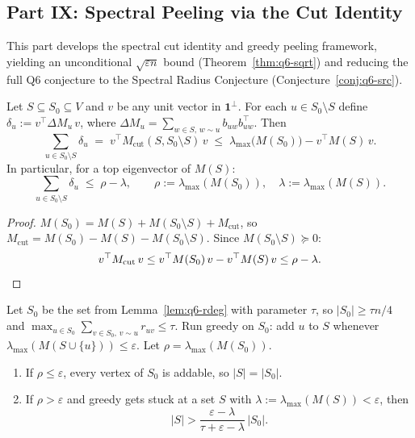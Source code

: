 \subsection*{Part IX: Spectral Peeling via the Cut Identity}

This part develops the spectral cut identity and greedy peeling
framework, yielding an unconditional $\sqrt{\varepsilon n}$ bound
(Theorem~\ref{thm:q6-sqrt}) and reducing the full Q6 conjecture to
the Spectral Radius Conjecture (Conjecture~\ref{conj:q6-src}).

\begin{lemma}\label{lem:q6-cut-id}
Let $S\subseteq S_0\subseteq V$ and $v$ be any unit vector in
$\mathbf{1}^\perp$.
For each $u\in S_0\setminus S$ define
$\delta_u := v^\top\!\Delta M_u\,v$,
where $\Delta M_u = \sum_{w\in S,\,w\sim u} b_{uw}b_{uw}^\top$.
Then
\[
\sum_{u\in S_0\setminus S} \delta_u
\;=\;
v^\top M_{\mathrm{cut}}(S,S_0\setminus S)\,v
\;\le\;
\lambda_{\max}\!\bigl(M(S_0)\bigr)-v^\top M(S)\,v.
\]
In particular, for a top eigenvector of $M(S)$:
\[
\sum_{u\in S_0\setminus S}\delta_u
\;\le\;
\rho-\lambda,
\qquad
\rho:=\lambda_{\max}(M(S_0)),\quad
\lambda:=\lambda_{\max}(M(S)).
\]
\end{lemma}

\begin{proof}
$M(S_0)=M(S)+M(S_0\setminus S)+M_{\mathrm{cut}}$, so
$M_{\mathrm{cut}}=M(S_0)-M(S)-M(S_0\setminus S)$.
Since $M(S_0\setminus S)\succeq 0$:
\[
v^\top M_{\mathrm{cut}}\,v
\le v^\top M(S_0)\,v - v^\top M(S)\,v
\le \rho-\lambda.\qedhere
\]
\end{proof}

\begin{theorem}
\label{thm:q6-greedy-nonstuck}
Let $S_0$ be the set from Lemma~\ref{lem:q6-rdeg} with parameter
$\tau$, so $|S_0|\ge\tau n/4$ and
$\max_{u\in S_0}\sum_{v\in S_0,\,v\sim u}r_{uv}\le\tau$.
Run greedy on $S_0$: add $u$ to $S$ whenever
$\lambda_{\max}(M(S\cup\{u\}))\le\varepsilon$.
Let $\rho=\lambda_{\max}(M(S_0))$.
\begin{enumerate}[nosep]
\item If $\rho\le\varepsilon$, every vertex of $S_0$ is addable, so
$|S|=|S_0|$.
\item If $\rho>\varepsilon$ and greedy gets stuck at a set $S$ with
$\lambda:=\lambda_{\max}(M(S))<\varepsilon$, then
\[
|S|>\frac{\varepsilon-\lambda}{\tau+\varepsilon-\lambda}\,|S_0|.
\]
\end{enumerate}
\end{theorem}

